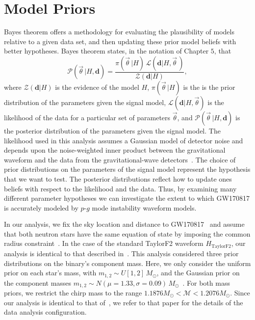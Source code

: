 \section{Model Priors} \label{sec:priors}
Bayes theorem offers a methodology for evaluating the plausibility of models relative to a given data set, and then updating these prior model beliefs with better hypotheses. Bayes theorem states, in the notation of Chapter $5$, that
\begin{equation}
\mathcal{P}\left(\vec{\theta}\,| H, \mathbf{d}\right) = \frac{\pi\left(\vec{\theta}\,|H\right) \, \mathcal{L}\left(\mathbf{d}|H, \vec{\theta}\,\right)}{\mathcal{Z}\left(\mathbf{d}|H\right)},
\label{eq:bayestheorem}
\end{equation}
where $\mathcal{Z} \left(\mathbf{d}|H \right)$ is the evidence of the model $H$, $\pi \left(\vec{\theta}\,|H\right)$ is the is the prior distribution of the parameters given the signal model, $\mathcal{L}\left(\mathbf{d}|H, \vec{\theta}\right)$ is the likelihood of the data for a particular set of parameters $\vec{\theta}$, and $\mathcal{P}\left( \vec{\theta}\,|H, \mathbf{d}\right)$ is the posterior distribution of the parameters given the signal model. The likelihood used in this analysis assumes a Gaussian model of detector noise and depends upon the noise-weighted inner product between the gravitational waveform and the data from the gravitational-wave detectors~\citep{Finn:2000hj,Rover:2006bb}. The choice of prior distributions on the parameters of the signal model represent the hypothesis that we want to test. The posterior distributions reflect how to update ones beliefs with respect to the likelihood and the data. Thus, by examining many different parameter hypotheses we can investigate the extent to which GW170817 is accurately modeled by $p$-$g$ mode instability waveform models.

In our analysis, we fix the sky location and distance to GW170817~\citep{Soares-Santos:2017lru,Cantiello:2018ffy} and assume that both neutron stars have the same equation of state by imposing the common radius constraint~\citep{de2018tidal}. In the case of the standard TaylorF2 waveform $H_\mathrm{TaylorF2}$, our analysis is identical to that described in~\cite{de2018tidal}. This analysis considered three prior distributions on the binary's component mass. Here, we only consider the uniform prior on each star's mass, with $m_{1,2} \sim U[1,2]\, M_\odot$, and the Gaussian prior on the component masses $m_{1,2} \sim N(\mu = 1.33, \sigma = 0.09)\, M_\odot$~\citep{Ozel:2016oaf}. For both mass priors, we restrict the chirp mass to the range $ 1.1876 M_\odot < \mathcal{M} < 1.2076 M_\odot$. Since our analysis is identical to that of~\citep{de2018tidal}, we refer to that paper for the details of the data analysis configuration.

